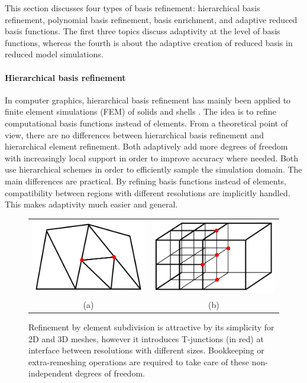 This section discusses four types of basis refinement: hierarchical basis refinement, polynomial basis refinement, basis enrichment, and adaptive reduced basis functions.
The first three topics discuss adaptivity at the level of basis functions, whereas the fourth is about the adaptive creation of reduced basis in reduced model simulations.

\paragraph*{Hierarchical basis refinement}
In computer graphics, hierarchical basis refinement has mainly been applied to finite element simulations (FEM) of solids and shells \cite{Capell2002,Grinspun2002}. The idea is to refine computational basis functions instead of elements. From a theoretical point of view, there are no differences between hierarchical basis refinement and hierarchical element refinement. Both adaptively add more degrees of freedom with increasingly local support in order to improve accuracy where needed. Both use hierarchical schemes in order to efficiently sample the simulation domain.
The main differences are practical. By refining basis functions instead of elements, compatibility between regions with different resolutions are implicitly handled.
This makes adaptivity much easier and general.

\begin{figure}[t]
\centering
\begin{tabular}{cc}
    \includegraphics[width=0.35\linewidth]{images/starAdaptivity-cgf2016/tjunction-triangle.png} &
    \includegraphics[width=0.35\linewidth]{images/starAdaptivity-cgf2016/tjunction-grid.png} \\
(a) & (b)
\end{tabular}
\caption[STAR adaptivity: T-junction]{\label{fig:tjunctions} Refinement by element subdivision is attractive by its simplicity for 2D and 3D meshes, however it introduces T-junctions (in red) at interface between resolutions with different sizes. Bookkeeping or extra-remeshing operations are required to take care of these non-independent degrees of freedom.}
\end{figure}

